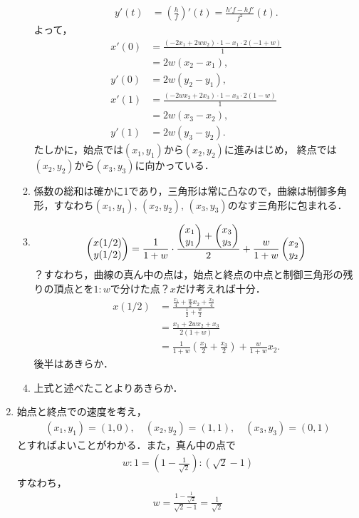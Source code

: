 \documentclass[9pt]{ltjsarticle}
\begin{document}
\begin{enumerate}[label=(問題\arabic*)]
\begin{enumerate}[label=(\alph*)]
\begin{align}
 y'(t)& = (\frac{h}{f})'(t) = \frac{h'f - hf'}{f^2}(t).
\end{align}
よって，
\begin{align}
 x'(0) &= \frac{(-2x_1 + 2wx_2)\cdot 1 - x_1\cdot 2(-1+w)}{1}\\
&=
2w(x_2-x_1),\\
 y'(0)& =2w(y_2-y_1),\\
 x'(1)& =\frac{(-2wx_2+2x_3)\cdot 1 - x_3\cdot 2(1-w)}{1}\\
 & =
2w(x_3-x_2),\\
 y'(1)& = 2w(y_3-y_2).
\end{align}
たしかに，始点では$(x_1,y_1)$から$(x_2,y_2)$に進みはじめ，
終点では$(x_2,y_2)$から$(x_3,y_3)$に向かっている．
 \item 係数の総和は確かに1であり，三角形は常に凸なので，曲線は制御多角形，すなわち$(x_1,y_1),\, (x_2,y_2),\, (x_3,y_3)$のなす三角形に包まれる．
 \item
\begin{align}
 \left(\begin{matrix} x(1/2) \\ y(1/2) \end{matrix}\right) =
\frac{1}{1+w}\cdot \frac{\left(\begin{matrix} x_1 \\ y_1 \end{matrix}\right) + \left(\begin{matrix} x_3 \\ y_3 \end{matrix}\right)}{2}
+
\frac{w}{1+w}\left(\begin{matrix} x_2 \\ y_2 \end{matrix}\right)
\end{align}
？すなわち，曲線の真ん中の点は，始点と終点の中点と制御三角形の残りの頂点とを$1:w$で分けた点？$x$だけ考えれば十分．
\begin{align}
 x(1/2)
&=
\frac{\frac{x_1}{4} + \frac{w}{2}x_2 + \frac{x_3}{4}}{\frac{1}{2}+\frac{w}{2}}\\
 & =
\frac{x_1 + 2wx_2 + x_3}{2(1+w)}\\
 & =
\frac{1}{1+w}(\frac{x_1}{2} + \frac{x_3}{2}) + \frac{w}{1+w}x_2.
\end{align}
後半はあきらか．
 \item 上式と述べたことよりあきらか．
\end{enumerate}
 \item 始点と終点での速度を考え，
\begin{align}
 (x_1,y_1) = (1,0),\quad (x_2,y_2) = (1,1),\quad (x_3,y_3)= (0,1)
\end{align}
とすればよいことがわかる．また，真ん中の点で
\begin{align}
 w:1  = (1-\frac{1}{\sqrt{2}}):(\sqrt{2}-1)
\end{align}
すなわち，
\begin{align}
 w= \frac{1-\frac{1}{\sqrt{2}}}{\sqrt{2}-1}
=\frac{1}{\sqrt{2}}
\end{align}

\end{enumerate}
\end{document}
